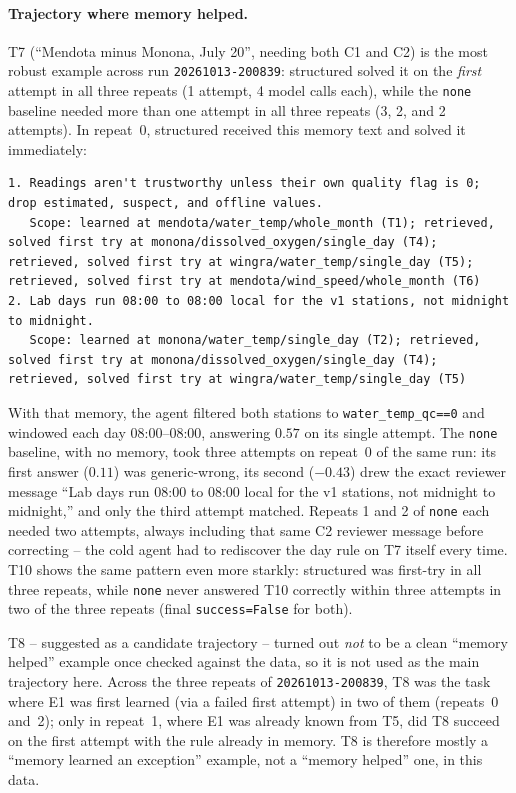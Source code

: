 \paragraph{Trajectory where memory helped.} T7 (``Mendota minus Monona, July 20'', needing both
C1 and C2) is the most robust example across run \texttt{20261013-200839}: structured solved it
on the \emph{first} attempt in all three repeats (1 attempt, 4 model calls each), while the
\texttt{none} baseline needed more than one attempt in all three repeats (3, 2, and 2 attempts).
In repeat~0, structured received this memory text and solved it immediately:

{\footnotesize
\begin{lstlisting}[breaklines=true, columns=fullflexible]
1. Readings aren't trustworthy unless their own quality flag is 0; drop estimated, suspect, and offline values.
   Scope: learned at mendota/water_temp/whole_month (T1); retrieved, solved first try at monona/dissolved_oxygen/single_day (T4); retrieved, solved first try at wingra/water_temp/single_day (T5); retrieved, solved first try at mendota/wind_speed/whole_month (T6)
2. Lab days run 08:00 to 08:00 local for the v1 stations, not midnight to midnight.
   Scope: learned at monona/water_temp/single_day (T2); retrieved, solved first try at monona/dissolved_oxygen/single_day (T4); retrieved, solved first try at wingra/water_temp/single_day (T5)
\end{lstlisting}
}

With that memory, the agent filtered both stations to \texttt{water\_temp\_qc==0} and windowed
each day 08:00--08:00, answering $0.57$ on its single attempt. The \texttt{none} baseline, with
no memory, took three attempts on repeat~0 of the same run: its first answer ($0.11$) was
generic-wrong, its second ($-0.43$) drew the exact reviewer message ``Lab days run 08:00 to
08:00 local for the v1 stations, not midnight to midnight,'' and only the third attempt matched.
Repeats 1 and 2 of \texttt{none} each needed two attempts, always including that same C2
reviewer message before correcting -- the cold agent had to rediscover the day rule on T7 itself
every time. T10 shows the same pattern even more starkly: structured was first-try in all three
repeats, while \texttt{none} never answered T10 correctly within three attempts in two of the
three repeats (final \texttt{success=False} for both).

T8 -- suggested as a candidate trajectory -- turned out \emph{not} to be a clean ``memory
helped'' example once checked against the data, so it is not used as the main trajectory here.
Across the three repeats of \texttt{20261013-200839}, T8 was the task where E1 was first
learned (via a failed first attempt) in two of them (repeats~0 and~2); only in repeat~1, where
E1 was already known from T5, did T8 succeed on the first attempt with the rule already in
memory. T8 is therefore mostly a ``memory learned an exception'' example, not a ``memory
helped'' one, in this data.
